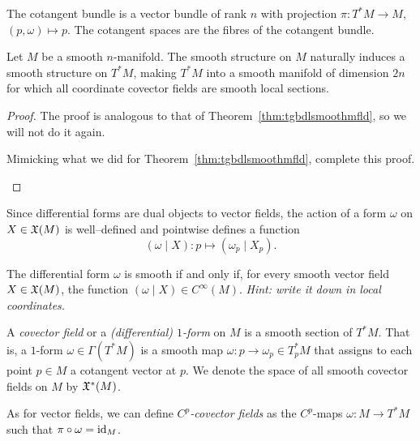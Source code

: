 The cotangent bundle is a vector bundle of rank $n$ with projection $\pi:T^*M\to M$, $(p,\omega)\mapsto p$.
The cotangent spaces are the fibres of the cotangent bundle. 

\begin{theorem}
  Let $M$ be a smooth $n$-manifold.
  The smooth structure on $M$ naturally induces a smooth structure on $T^*M$, making $T^*M$ into a smooth manifold of dimension $2n$ for which all coordinate covector fields are smooth local sections.
\end{theorem}
\begin{proof}
  The proof is analogous to that of Theorem~\ref{thm:tgbdlsmoothmfld}, so we will not do it again.
  \begin{exercise}
    Mimicking what we did for Theorem~\ref{thm:tgbdlsmoothmfld}, complete this proof.
  \end{exercise}
\end{proof}

Since differential forms are dual objects to vector fields, the action of a form $\omega$ on $X\in\mathfrak{X}(M)$ is well--defined and pointwise defines a function
\begin{equation}
  (\omega \mid X) : p \mapsto (\omega_p \mid X_p).
\end{equation}

\begin{exercise}
The differential form $\omega$ is smooth if and only if, for every smooth vector field $X\in\mathfrak{X}(M)$, the function $(\omega \mid X)\in C^\infty(M)$.
\textit{\small Hint: write it down in local coordinates.}
\end{exercise}

\begin{definition}
  A \emph{covector field} or a \emph{(differential) $1$-form} on $M$ is a smooth section of $T^*M$.
  That is, a $1$-form $\omega\in\Gamma(T^*M)$ is a smooth map $\omega: p \to \omega_p \in T_p^*M$ that assigns to each point $p\in M$ a cotangent vector at $p$.
  We denote the space of all smooth covector fields on $M$ by $\mathfrak{X}^*(M)$.

  As for vector fields, we can define \emph{$C^p$-covector fields} as the $C^p$-maps $\omega:M\to T^*M$ such that $\pi\circ\omega = \operatorname{id}_M$.
\end{definition}

